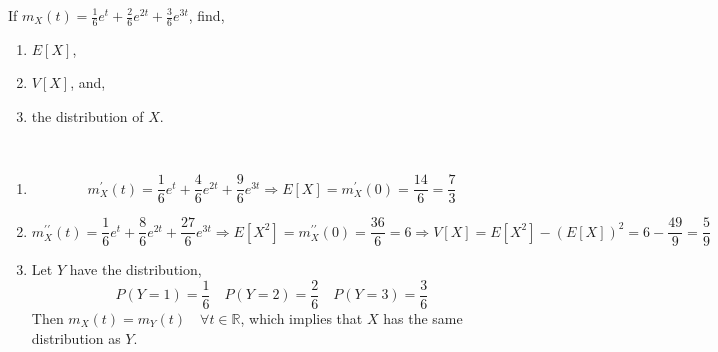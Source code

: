 \begin{example}
    If $m_X(t) = \frac{1}{6} e^t + \frac{2}{6} e^{2t} + \frac{3}{6} e^{3t}$,
find,
    \begin{enumerate}[noitemsep, topsep=0em]
        \item $E[X]$,
        \item $V[X]$, and,
        \item the distribution of $X$.
    \end{enumerate}
\end{example}
\begin{solution} \quad                                                       \\
    \begin{enumerate}[noitemsep, topsep=0em]
        \item
        \[
             m_X^\prime(t) 
           = \frac{1}{6}e^t + \frac{4}{6}e^{2t} + \frac{9}{6}e^{3t}
           \Rightarrow
           E[X] = m_X^\prime(0) = \frac{14}{6} = \frac{7}{3}
        \]
        \item
        \[
             m_X^{\prime\prime}(t)
           = \frac{1}{6}e^t + \frac{8}{6}e^{2t} + \frac{27}{6}e^{3t}
           \Rightarrow
           E[X^2] = m_X^{\prime\prime}(0) = \frac{36}{6} = 6
           \Rightarrow
           V[X] = E[X^2] - (E[X])^2
                = 6 - \frac{49}{9} = \frac{5}{9}
        \]
        \item
        Let $Y$ have the distribution,
        \[
            P(Y = 1) = \frac{1}{6} \quad
            P(Y = 2) = \frac{2}{6} \quad
            P(Y = 3) = \frac{3}{6}
        \]
        Then $m_X(t) = m_Y(t) \quad \forall t \in \mathbb{R}$, which implies
that $X$ has the same distribution as $Y$.
    \end{enumerate}
\end{solution}